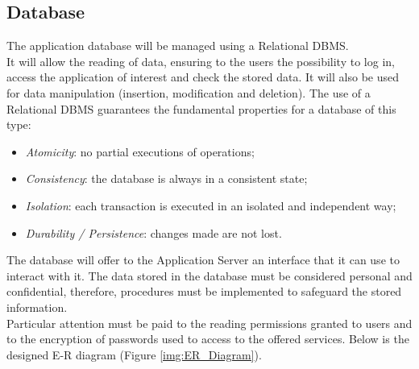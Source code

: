 \subsection{Database}
The application database will be managed using a Relational DBMS. \\
It will allow the reading of data, ensuring to the users the possibility to log in, access the application of interest and check the stored data.
It will also be used for data manipulation (insertion, modification and deletion).
The use of a Relational DBMS guarantees the fundamental properties for a database of this type:
\begin{itemize}
  \item \textit{Atomicity}: no partial executions of operations;
  \item \textit{Consistency}: the database is always in a consistent state;
  \item \textit{Isolation}: each transaction is executed in an isolated and independent way;
  \item \textit{Durability / Persistence}: changes made are not lost.
\end{itemize}
The database will offer to the Application Server an interface that it can use to interact with it.
The data stored in the database must be considered personal and confidential, therefore, procedures must be implemented to safeguard the stored information.\\
Particular attention must be paid to the reading permissions granted to users and to the encryption of passwords used to access to the offered services.
Below is the designed E-R diagram (Figure \ref{img:ER_Diagram}).

